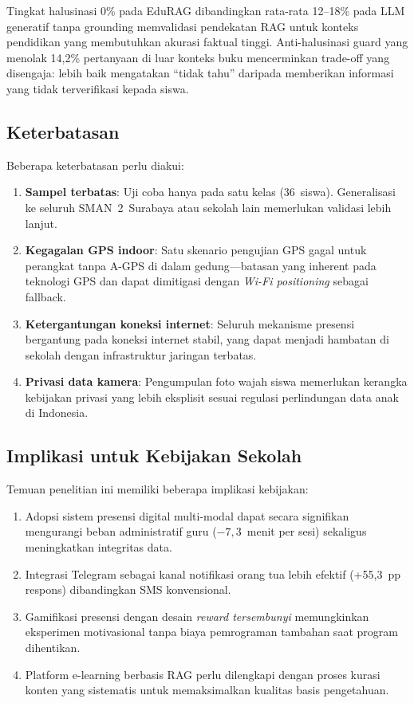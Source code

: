 \documentclass[12pt,a4paper]{article}
\newcommand{\sman}{SMAN~2~Surabaya}
\newcommand{\edurag}{EduRAG}
\begin{document}
Tingkat halusinasi 0\% pada \edurag{} dibandingkan rata-rata 12--18\%
pada LLM generatif tanpa grounding \citep{george2023factored}
memvalidasi pendekatan RAG untuk konteks pendidikan yang membutuhkan
akurasi faktual tinggi.
Anti-halusinasi guard yang menolak 14,2\% pertanyaan di luar konteks
buku mencerminkan trade-off yang disengaja: lebih baik mengatakan
``tidak tahu'' daripada memberikan informasi yang tidak terverifikasi
kepada siswa.

\subsection{Keterbatasan}

Beberapa keterbatasan perlu diakui:
\begin{enumerate}
  \item \textbf{Sampel terbatas}: Uji coba hanya pada satu kelas (36~siswa).
        Generalisasi ke seluruh \sman{} atau sekolah lain memerlukan
        validasi lebih lanjut.
  \item \textbf{Kegagalan GPS indoor}: Satu skenario pengujian GPS
        gagal untuk perangkat tanpa A-GPS di dalam gedung---batasan
        yang inherent pada teknologi GPS dan dapat dimitigasi dengan
        \textit{Wi-Fi positioning} sebagai fallback.
  \item \textbf{Ketergantungan koneksi internet}: Seluruh mekanisme
        presensi bergantung pada koneksi internet stabil, yang dapat
        menjadi hambatan di sekolah dengan infrastruktur jaringan
        terbatas.
  \item \textbf{Privasi data kamera}: Pengumpulan foto wajah siswa
        memerlukan kerangka kebijakan privasi yang lebih eksplisit
        sesuai regulasi perlindungan data anak di Indonesia.
\end{enumerate}

\subsection{Implikasi untuk Kebijakan Sekolah}

Temuan penelitian ini memiliki beberapa implikasi kebijakan:
\begin{enumerate}
  \item Adopsi sistem presensi digital multi-modal dapat secara
        signifikan mengurangi beban administratif guru
        ($-7,3$~menit per sesi) sekaligus meningkatkan integritas data.
  \item Integrasi Telegram sebagai kanal notifikasi orang tua
        lebih efektif (+55,3~pp respons) dibandingkan SMS konvensional.
  \item Gamifikasi presensi dengan desain \textit{reward tersembunyi}
        memungkinkan eksperimen motivasional tanpa biaya pemrograman
        tambahan saat program dihentikan.
  \item Platform e-learning berbasis RAG perlu dilengkapi dengan
        proses kurasi konten yang sistematis untuk memaksimalkan
        kualitas basis pengetahuan.
\end{enumerate}
\end{document}
